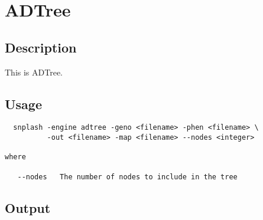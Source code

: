 \section{ADTree}
\label{sec:adtree}
\subsection{Description}
This is ADTree.
\subsection{Usage}

\begin{verbatim}
  snplash -engine adtree -geno <filename> -phen <filename> \
          -out <filename> -map <filename> --nodes <integer>

where

   --nodes   The number of nodes to include in the tree

\end{verbatim}

\subsection{Output}

